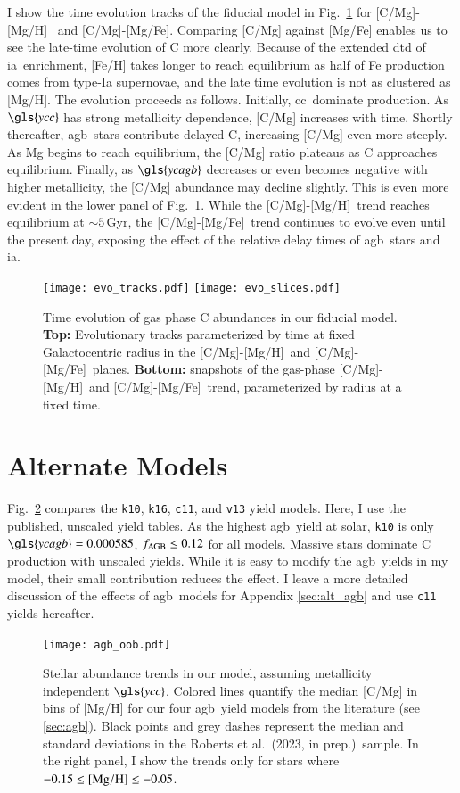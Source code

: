 \documentclass[12pt,oneside,letterpaper]{report}
\newcommand{\cc}{\gls{cc}}
\newcommand{\agb}{\gls{agb}}
\newcommand{\ia}{\gls{ia}}
\newcommand{\cxi}{\texttt{\gls{c11}}}
\newcommand{\kx}{\texttt{\gls{k10}}}
\newcommand{\kxvi}{\texttt{\gls{k16}}}
\newcommand{\vxiii}{\texttt{\gls{v13}}}
\newcommand{\Ycc}{\gls{ycc}}
\newcommand{\Ycagb}{\gls{ycagb}}
\newcommand{\caah}{[C/Mg]-[Mg/H]}
\newcommand{\caafe}{[C/Mg]-[Mg/Fe]}
\newcommand{\citetjack}{Roberts et al.~(2023, in prep.)}
\newcommand{\about}[1]{${\sim} #1$}
\begin{document}
I show the time evolution tracks of the fiducial model in Fig.~\ref{fig:c_evo} for \caah~ and \caafe. Comparing [C/Mg] against [Mg/Fe] enables us to see the late-time evolution of C more clearly. Because of the extended \gls{dtd} of \ia\ enrichment, [Fe/H] takes longer to reach equilibrium as half of Fe production comes from type-Ia supernovae, and the late time evolution is not as clustered as [Mg/H].
The evolution proceeds as follows.
Initially, \cc\ dominate production. As $\Ycc$ has strong metallicity dependence, [C/Mg] increases with time. Shortly thereafter, \agb\ stars contribute delayed C, increasing [C/Mg] even more steeply. As Mg begins to reach equilibrium, the [C/Mg] ratio plateaus as C approaches equilibrium. Finally, as $\Ycagb$ decreases or even becomes negative with higher metallicity, the [C/Mg] abundance may decline slightly. 
This is even more evident in the lower panel of Fig.~\ref{fig:c_evo}. While the \caah\ trend reaches equilibrium at \about{5}\,Gyr, the \caafe\ trend continues to evolve even until the present day, exposing the effect of the relative delay times of \agb\ stars and \ia.


\begin{figure}[htp]
\centering
\texttt{[image: evo\_tracks.pdf]}
\texttt{[image: evo\_slices.pdf]}
\caption[C chemical evolution tracks]{
    Time evolution of gas phase C abundances in our fiducial model.
    {\bf Top:} Evolutionary tracks parameterized by time at fixed Galactocentric radius in the \caah\ and \caafe\ planes. 
    {\bf Bottom:} snapshots of the gas-phase \caah\ and \caafe\ trend, parameterized by radius at a fixed time.
}
\label{fig:c_evo}
\end{figure}

\section{Alternate Models}\label{sec:f-z-models}

Fig.~\ref{fig:agb_sims} compares the \kx{}, \kxvi{}, \cxi{}, and \vxiii{} yield models. Here, I use the published, unscaled yield tables. As the highest \agb\ yield at solar, \kx{} is only $\Ycagb=0.000585$, $f_{\rm AGB} \leq 0.12$ for all models. Massive stars dominate C production with unscaled yields.  While it is easy to modify the \agb\ yields in my model, their small contribution reduces the effect. I leave a more detailed discussion of the effects of \agb\ models for Appendix \ref{sec:alt_agb} and use \cxi{} yields hereafter.

\begin{figure}[htp]
\centering
\texttt{[image: agb\_oob.pdf]}
\caption[Mean stellar abundance trends]{
    Stellar abundance trends in our model, assuming metallicity independent $\Ycc$. Colored lines quantify the median [C/Mg] in bins of [Mg/H] for our four \agb\ yield models from the literature (see \ref{sec:agb}). Black points and grey dashes represent the median and standard deviations in the \citetjack~sample. In the right panel, I show the trends only for stars where $-0.15\leq {\rm [Mg/H]}\leq -0.05$.
}
\label{fig:agb_sims}
\end{figure}
\end{document}
